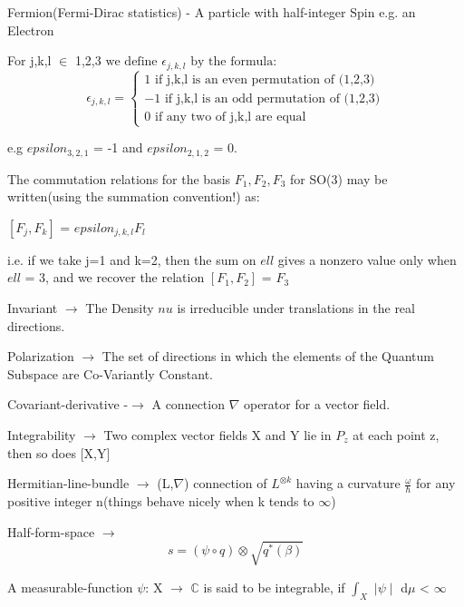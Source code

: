 \documentclass[a4paper, 10pt, onepage]{elegantbook}
\begin{document}
{Fermion(Fermi-Dirac statistics) - A particle with half-integer Spin e.g. an Electron

For j,k,l $\in$ {1,2,3} $\text{we define}$ $\epsilon_{j,k,l}$ $\text{by the formula:}$
\begin{equation}
\epsilon_{j,k,l} = \left\{
\begin{array}{ll}
   1 \text{ if {j,k,l} is an even permutation of (1,2,3)} \\  
  -1 \text{ if {j,k,l} is  an odd permutation of (1,2,3)}  \\
   0 \text{ if any two of {j,k,l} are equal}  
\end{array}
\right.
\end{equation}

e.g $epsilon_{3,2,1}$ = -1 and $epsilon _{2,1,2}$ = 0.  

The commutation relations for the basis ${F_1,F_2,F_3}$ for SO(3) may be written(using the summation convention!) as:

$[F_j,F_k]$ = $epsilon_{j,k,l}F_l$  

i.e. if we take j=1 and k=2, then the sum on $ell$ gives a nonzero value only when $ell$ = 3, and we recover the 
relation $[F_1,F_2]$ = $F_3$  

Invariant $\rightarrow$ The Density $nu$ is irreducible under translations in the real directions. 
 
Polarization $\rightarrow$ The set of directions in which the elements of the Quantum Subspace are 
Co-Variantly Constant.  
 
Covariant-derivative -$\rightarrow$ A connection $\nabla$ operator for a vector field.
  
Integrability $\rightarrow$ Two complex vector fields X and Y lie in $P_z$ at each point z, then 
so does [X,Y]
 
Hermitian-line-bundle $\longrightarrow$
(L,$\nabla$) connection of $L^{{\otimes}{k}}$ having a curvature $\frac{\omega}{\hbar}$
for any positive integer n(things behave nicely when k tends to $\infty$)

Half-form-space $\longrightarrow$
\begin{equation}
s = (\psi \circ q ) \otimes \sqrt{q^*(\beta)}
\end{equation}

A measurable-function $\psi$: X $\longrightarrow$ $\mathbb C$ is said to be integrable,
if $\int_X$ $\mid \psi \mid$ d$\mu$ < $\infty$

}
\end{document}
